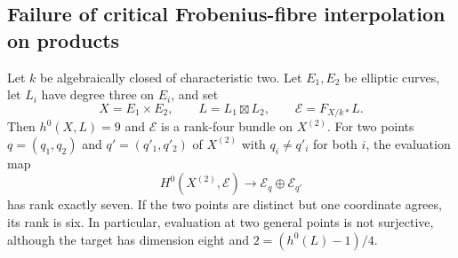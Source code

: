 \subsection{Failure of critical Frobenius-fibre interpolation on products}

\begin{lemma}
\label{lem:DE-A4-product-Frobenius-interpolation}
Let $k$ be algebraically closed of characteristic two. Let $E_1,E_2$
be elliptic curves, let $L_i$ have degree three on $E_i$, and set
\[
X=E_1\times E_2,\qquad L=L_1\boxtimes L_2,\qquad
\mathcal E=F_{X/k*}L.
\]
Then $h^0(X,L)=9$ and $\mathcal E$ is a rank-four bundle on $X^{(2)}$.
For two points $q=(q_1,q_2)$ and $q'=(q'_1,q'_2)$ of $X^{(2)}$
with $q_i\ne q'_i$ for both $i$, the evaluation map
\[
H^0(X^{(2)},\mathcal E)\longrightarrow
                         \mathcal E_q\oplus\mathcal E_{q'}
\tag{DE-FI1}
\]
has rank exactly seven. If the two points are distinct but one
coordinate agrees, its rank is six. In particular, evaluation at
two general points is not surjective, although the target has
dimension eight and $2=(h^0(L)-1)/4$.
\end{lemma}
